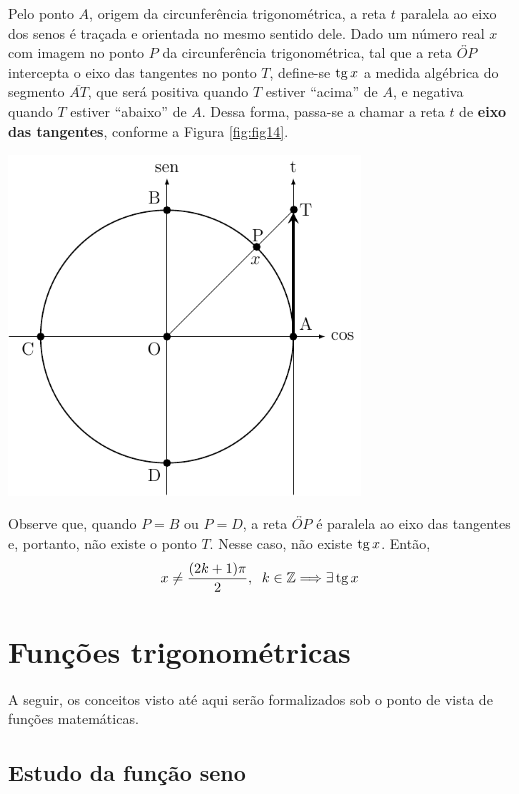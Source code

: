 Pelo ponto $A$, origem da circunferência trigonométrica, a reta $t$ paralela ao eixo dos senos é traçada e orientada no mesmo sentido dele. Dado um número real $x$ com imagem no ponto $P$ da circunferência trigonométrica, tal que a reta $\overleftrightarrow{OP}$ intercepta o eixo das tangentes no ponto $T$, define-se $\operatorname{tg} x$ a medida algébrica do segmento $\overline{AT}$, que será positiva quando $T$ estiver “acima” de $A$, e negativa quando $T$ estiver “abaixo” de $A$. Dessa forma, passa-se a chamar a reta $t$ de \textbf{eixo das tangentes}, conforme a Figura \ref{fig:fig14}.
\begin{center}
    \begin{minipage}{10cm}
        \centering
            \includegraphics[width=0.7\textwidth]{Imagens/fig14.pdf}
            \label{fig:fig14}
    \end{minipage}
\end{center}

Observe que, quando $P=B$ ou $P=D$, a reta $\overleftrightarrow{OP}$ é paralela ao eixo das tangentes e, portanto, não existe o ponto $T$. Nesse caso, não existe $\operatorname{tg} x$. Então,
\[
x \neq \dfrac{(2 k + 1) \pi}{2}, \;\; k \in \mathbb{Z} \Longrightarrow  \exists \operatorname{tg} x 
\]
\section{Funções trigonométricas}	

A seguir, os conceitos visto até aqui serão formalizados sob o ponto de vista de funções matemáticas.

\subsection{Estudo da função seno}

